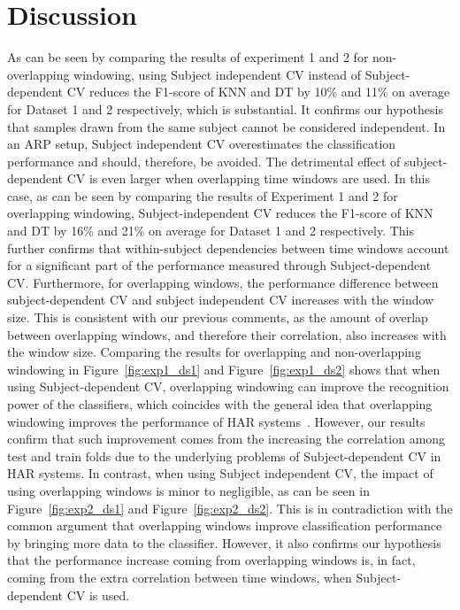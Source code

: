 \documentclass[sensors,article,submit,moreauthors,pdftex]{Definitions/mdpi}
\begin{document}
\section{Discussion} \label{sec:discussion}
As can be seen by comparing the results of experiment 1 and 2 for non-overlapping windowing, using Subject independent CV instead of 
Subject-dependent CV reduces the F1-score of KNN and DT by 10\% and 11\% on average for Dataset 1 and 2 respectively, which is substantial. It confirms our hypothesis that samples drawn from the 
same subject cannot be considered independent. In an ARP setup, Subject independent CV overestimates the classification performance and should, therefore, be avoided.
The detrimental effect of subject-dependent CV is even larger when overlapping time windows are used. In this case, as can be seen by comparing the results of Experiment 1 and 2 for overlapping windowing, Subject-independent CV reduces the F1-score of KNN and DT by 16\% and 21\% on average for Dataset 1 and 2 respectively. This 
further confirms that within-subject dependencies between time windows account for a significant part of the performance measured through 
Subject-dependent CV. Furthermore, for overlapping windows, the performance 
difference between subject-dependent CV and subject independent CV increases with the window 
size. This is consistent with our previous comments, as the amount of 
overlap between overlapping windows, and therefore their correlation, 
also increases with the window size.
Comparing the results for overlapping and non-overlapping windowing in Figure~\ref{fig:exp1_ds1} and Figure~\ref{fig:exp1_ds2} shows that when using Subject-dependent CV, overlapping windowing can improve the recognition power of the classifiers, which coincides with the general idea that overlapping windowing improves the performance of HAR systems~\cite{janidarmian2017comprehensive,janidarmian2014automated}. 
However, our results confirm that such improvement comes from the 
increasing the correlation among test and train folds due to the underlying 
problems of Subject-dependent CV in HAR systems.      
In contrast, when using Subject independent CV, the impact of using overlapping
windows is minor to negligible, as can be seen in  
Figure~\ref{fig:exp2_ds1} and Figure~\ref{fig:exp2_ds2}. This is in contradiction with 
the common argument that overlapping windows improve classification
performance by bringing more data to the classifier. However, it also 
confirms our hypothesis that the performance increase coming from 
overlapping windows is, in fact, coming from the extra correlation 
between time windows, when Subject-dependent CV is used.
\end{document}
